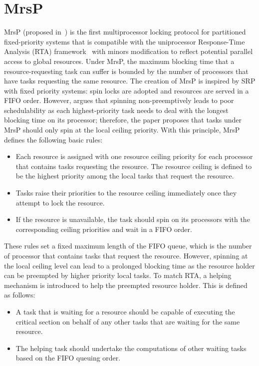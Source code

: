 \documentclass{report}
\begin{document}
\chapter{MrsP}
\label{MrsP Review}
MrsP (proposed in~\cite{burns2013schedulability}) is the first multiprocessor locking protocol for partitioned fixed-priority systems that is compatible with the uniprocessor Response-Time Analysis (RTA) framework~\cite{audsley1993applying} with minors modification to reflect potential parallel access to global resources. Under MrsP, the maximum blocking time that a resource-requesting task can suffer is bounded by the number of processors that have tasks requesting the same resource. The creation of MrsP is inspired by SRP with fixed priority systems: spin locks are adopted and resources are served in a FIFO order. However, \cite{burns2013schedulability} argues that spinning non-preemptively leads to poor schedulability as each highest-priority task needs to deal with the longest blocking time on its processor;  therefore, the paper proposes that tasks under MrsP should only spin at the local ceiling priority. With this principle, MrsP defines the following basic rules:
\begin{itemize}
\item Each resource is assigned with one resource ceiling priority for each processor that contains tasks requesting the resource. The resource ceiling is defined to be the highest priority among the local tasks that request the resource.
\item Tasks raise their priorities to the resource ceiling immediately once they attempt to lock the resource. 
\item If the resource is unavailable, the task should spin on its processors with the corresponding ceiling priorities and wait in a FIFO order.
\end{itemize}

These rules set a fixed maximum length of the FIFO queue, which is the number of processor that contains tasks that request the resource. However, spinning at the local ceiling level can lead to a prolonged blocking time as the resource holder can be preempted by higher priority local tasks. To match RTA, a helping mechanism is introduced to help the preempted resource holder. This is defined as follows:
\begin{itemize}
\item A task that is waiting for a resource should be capable of executing the critical section on behalf of any other tasks that are waiting for the same resource.
\item The helping task should undertake the computations of other waiting tasks based on the FIFO queuing order.
\end{itemize}
\end{document}
